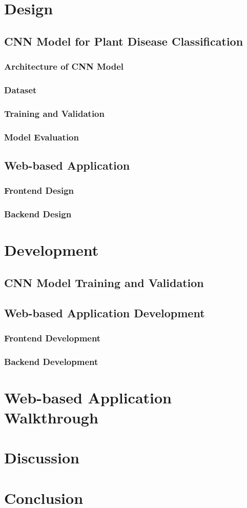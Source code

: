 \documentclass{BachelorBUI}
\begin{document}
\section{Design}

\subsection{CNN Model for Plant Disease Classification}
\subsubsection{Architecture of CNN Model}
\subsubsection{Dataset}
\subsubsection{Training and Validation}
\subsubsection{Model Evaluation}

\subsection{Web-based Application}
\subsubsection{Frontend Design}
\subsubsection{Backend Design}

\section{Development}

\subsection{CNN Model Training and Validation}
\subsection{Web-based Application Development}
\subsubsection{Frontend Development}
\subsubsection{Backend Development}

\section{Web-based Application Walkthrough}

\section{Discussion}

\section{Conclusion}

\printbibliography
\end{document}
